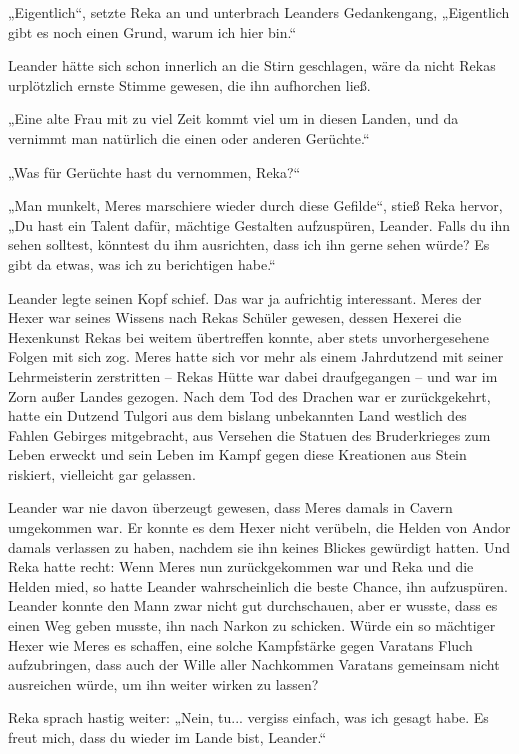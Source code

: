 \documentclass[10pt, a4paper, oneside]{book}
\begin{document}
„Eigentlich“, setzte Reka an und unterbrach Leanders Gedankengang, „Eigentlich gibt es noch einen Grund, warum ich hier bin.“

Leander hätte sich schon innerlich an die Stirn geschlagen, wäre da nicht Rekas urplötzlich ernste Stimme gewesen, die ihn aufhorchen ließ.

„Eine alte Frau mit zu viel Zeit kommt viel um in diesen Landen, und da vernimmt man natürlich die einen oder anderen Gerüchte.“

„Was für Gerüchte hast du vernommen, Reka?“

„Man munkelt, Meres marschiere wieder durch diese Gefilde“, stieß Reka hervor, „Du hast ein Talent dafür, mächtige Gestalten aufzuspüren, Leander. Falls du ihn sehen solltest, könntest du ihm ausrichten, dass ich ihn gerne sehen würde? Es gibt da etwas, was ich zu berichtigen habe.“

Leander legte seinen Kopf schief. Das war ja aufrichtig interessant. Meres der Hexer war seines Wissens nach Rekas Schüler gewesen, dessen Hexerei die Hexenkunst Rekas bei weitem übertreffen konnte, aber stets unvorhergesehene Folgen mit sich zog. Meres hatte sich vor mehr als einem Jahrdutzend mit seiner Lehrmeisterin zerstritten – Rekas Hütte war dabei draufgegangen – und war im Zorn außer Landes gezogen. Nach dem Tod des Drachen war er zurückgekehrt, hatte ein Dutzend Tulgori aus dem bislang unbekannten Land westlich des Fahlen Gebirges mitgebracht, aus Versehen die Statuen des Bruderkrieges zum Leben erweckt und sein Leben im Kampf gegen diese Kreationen aus Stein riskiert, vielleicht gar gelassen.

Leander war nie davon überzeugt gewesen, dass Meres damals in Cavern umgekommen war. Er konnte es dem Hexer nicht verübeln, die Helden von Andor damals verlassen zu haben, nachdem sie ihn keines Blickes gewürdigt hatten. Und Reka hatte recht: Wenn Meres nun zurückgekommen war und Reka und die Helden mied, so hatte Leander wahrscheinlich die beste Chance, ihn aufzuspüren. Leander konnte den Mann zwar nicht gut durchschauen, aber er wusste, dass es einen Weg geben musste, ihn nach Narkon zu schicken. Würde ein so mächtiger Hexer wie Meres es schaffen, eine solche Kampfstärke gegen Varatans Fluch aufzubringen, dass auch der Wille aller Nachkommen Varatans gemeinsam nicht ausreichen würde, um ihn weiter wirken zu lassen?

Reka sprach hastig weiter: „Nein, tu... vergiss einfach, was ich gesagt habe. Es freut mich, dass du wieder im Lande bist, Leander.“
\end{document}
